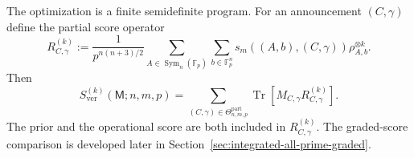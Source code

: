 \documentclass[11pt]{article}
\newcommand{\F}{\mathbb F}
\newcommand{\Sym}{\operatorname{Sym}}
\newcommand{\Tr}{\operatorname{Tr}}
\newcommand{\1}{\mathbf 1}
\theoremstyle{plain}
\theoremstyle{definition}
\theoremstyle{remark}
\begin{document}
The optimization is a finite semidefinite program.  For an announcement
$(C,\gamma)$ define the partial score operator
\begin{equation}
 R_{C,\gamma}^{(k)}
 :=\frac{1}{p^{n(n+3)/2}}
 \sum_{A\in\Sym_n(\F_p)}\sum_{b\in\F_p^n}
 s_m((A,b),(C,\gamma))\rho_{A,b}^{\otimes k}.
 \label{eq:partial-score-operator}
\end{equation}
Then
\begin{equation}
 S_{\mathrm{ver}}^{(k)}(\mathsf M;n,m,p)
 =\sum_{(C,\gamma)\in\Theta_{n,m,p}^{\mathrm{part}}}
 \Tr[M_{C,\gamma}R_{C,\gamma}^{(k)}].
 \label{eq:partial-score-operator-SDP}
\end{equation}
The prior and the operational score are both included in
$R_{C,\gamma}^{(k)}$.  The graded-score comparison is developed later in Section~\ref{sec:integrated-all-prime-graded}.
\end{document}
